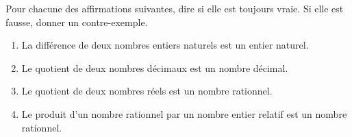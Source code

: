 \begin{exo}{}
	Pour chacune des affirmations suivantes, dire si elle est toujours vraie. Si elle est fausse, donner un contre-exemple.
	\begin{enumerate}
		\item La différence de deux nombres entiers naturels est un entier naturel.
		\item Le quotient de deux nombres décimaux est un nombre décimal.
		\item Le quotient de deux nombres réels est un nombre rationnel.
		\item Le produit d'un nombre rationnel par un nombre entier relatif est un nombre rationnel.
	\end{enumerate}
\end{exo}

